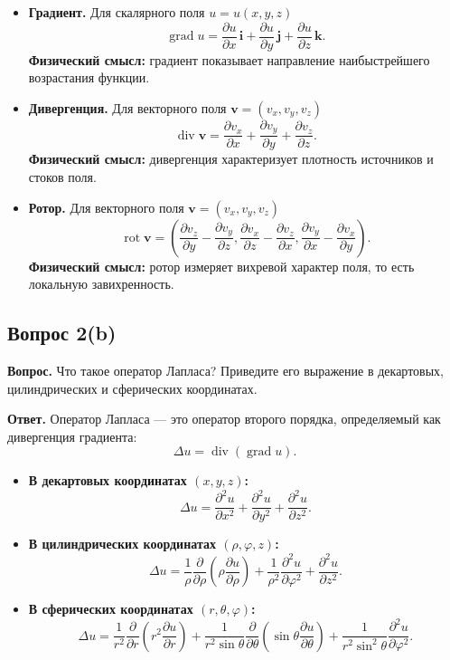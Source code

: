 \documentclass[a4paper,12pt]{article}
\newcommand{\grad}{\operatorname{grad}}
\newcommand{\diver}{\operatorname{div}}
\newcommand{\rot}{\operatorname{rot}}
\newcommand{\Question}[2]{\subsection*{Вопрос #1}\textbf{Вопрос.} #2}
\newcommand{\Answer}{\textbf{Ответ.}}
\begin{document}
\begin{itemize}
  \item \textbf{Градиент.} Для скалярного поля $u=u(x,y,z)$
  \[
  \grad u=
  \frac{\partial u}{\partial x}\,\mathbf{i}+
  \frac{\partial u}{\partial y}\,\mathbf{j}+
  \frac{\partial u}{\partial z}\,\mathbf{k}.
  \]
  \textbf{Физический смысл:} градиент показывает направление наибыстрейшего возрастания функции.

  \item \textbf{Дивергенция.} Для векторного поля $\mathbf{v}=(v_x,v_y,v_z)$
  \[
  \diver \mathbf{v}=
  \frac{\partial v_x}{\partial x}+
  \frac{\partial v_y}{\partial y}+
  \frac{\partial v_z}{\partial z}.
  \]
  \textbf{Физический смысл:} дивергенция характеризует плотность источников и стоков поля.

  \item \textbf{Ротор.} Для векторного поля $\mathbf{v}=(v_x,v_y,v_z)$
  \[
  \rot \mathbf{v}=
  \left(
  \frac{\partial v_z}{\partial y}-\frac{\partial v_y}{\partial z},
  \frac{\partial v_x}{\partial z}-\frac{\partial v_z}{\partial x},
  \frac{\partial v_y}{\partial x}-\frac{\partial v_x}{\partial y}
  \right).
  \]
  \textbf{Физический смысл:} ротор измеряет вихревой характер поля, то есть локальную завихренность.
\end{itemize}

\Question{2(b)}{Что такое оператор Лапласа? Приведите его выражение в декартовых, цилиндрических и сферических координатах.}

\Answer
Оператор Лапласа --- это оператор второго порядка, определяемый как дивергенция градиента:
\[
\Delta u=\diver(\grad u).
\]

\begin{itemize}
  \item \textbf{В декартовых координатах $(x,y,z)$:}
  \[
  \Delta u=
  \frac{\partial^2 u}{\partial x^2}+
  \frac{\partial^2 u}{\partial y^2}+
  \frac{\partial^2 u}{\partial z^2}.
  \]

  \item \textbf{В цилиндрических координатах $(\rho,\varphi,z)$:}
  \[
  \Delta u=
  \frac{1}{\rho}\frac{\partial}{\partial \rho}\left(\rho\frac{\partial u}{\partial \rho}\right)+
  \frac{1}{\rho^2}\frac{\partial^2 u}{\partial \varphi^2}+
  \frac{\partial^2 u}{\partial z^2}.
  \]

  \item \textbf{В сферических координатах $(r,\theta,\varphi)$:}
  \[
  \Delta u=
  \frac{1}{r^2}\frac{\partial}{\partial r}\left(r^2\frac{\partial u}{\partial r}\right)+
  \frac{1}{r^2\sin\theta}\frac{\partial}{\partial \theta}\left(\sin\theta\frac{\partial u}{\partial \theta}\right)+
  \frac{1}{r^2\sin^2\theta}\frac{\partial^2 u}{\partial \varphi^2}.
  \]
\end{itemize}
\end{document}
